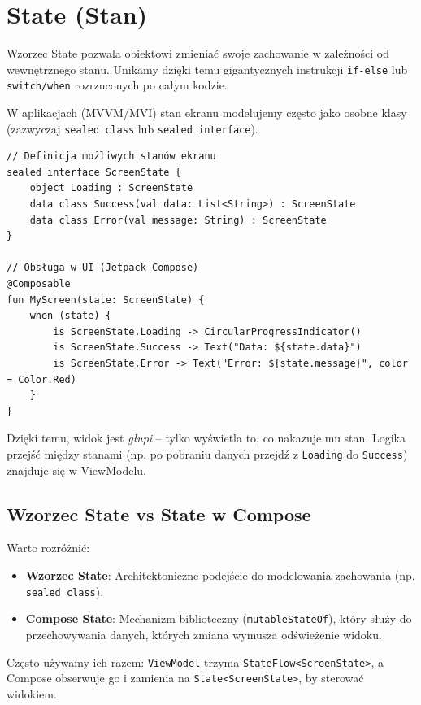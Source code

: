 \section{State (Stan)}

Wzorzec State pozwala obiektowi zmieniać swoje zachowanie w zależności od wewnętrznego stanu. Unikamy dzięki temu gigantycznych instrukcji \texttt{if-else} lub \texttt{switch/when} rozrzuconych po całym kodzie.

W aplikacjach (MVVM/MVI) stan ekranu modelujemy często jako osobne klasy (zazwyczaj \texttt{sealed class} lub \texttt{sealed interface}).

\begin{verbatim}
// Definicja możliwych stanów ekranu
sealed interface ScreenState {
    object Loading : ScreenState
    data class Success(val data: List<String>) : ScreenState
    data class Error(val message: String) : ScreenState
}

// Obsługa w UI (Jetpack Compose)
@Composable
fun MyScreen(state: ScreenState) {
    when (state) {
        is ScreenState.Loading -> CircularProgressIndicator()
        is ScreenState.Success -> Text("Data: ${state.data}")
        is ScreenState.Error -> Text("Error: ${state.message}", color = Color.Red)
    }
}
\end{verbatim}

Dzięki temu, widok jest \textit{głupi} – tylko wyświetla to, co nakazuje mu stan. Logika przejść między stanami (np. po pobraniu danych przejdź z \texttt{Loading} do \texttt{Success}) znajduje się w ViewModelu.

\subsection{Wzorzec State vs State w Compose}
Warto rozróżnić:
\begin{itemize}
    \item \textbf{Wzorzec State}: Architektoniczne podejście do modelowania zachowania (np. \texttt{sealed class}).
    \item \textbf{Compose State}: Mechanizm biblioteczny (\texttt{mutableStateOf}), który służy do przechowywania danych, których zmiana wymusza odświeżenie widoku.
\end{itemize}

Często używamy ich razem: \texttt{ViewModel} trzyma \texttt{StateFlow<ScreenState>}, a Compose obserwuje go i zamienia na \texttt{State<ScreenState>}, by sterować widokiem.

